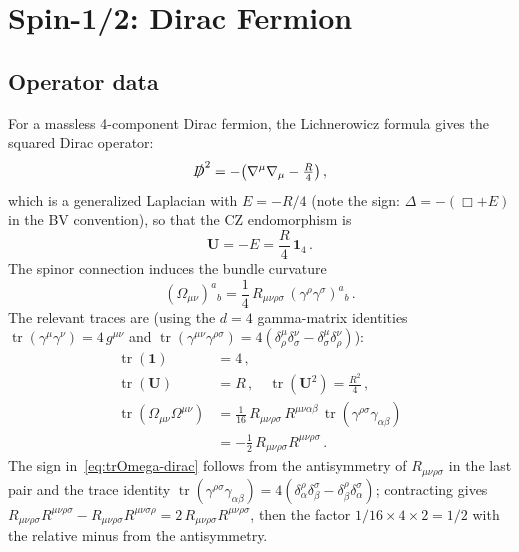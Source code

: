 \documentclass[aps,prd,twocolumn,superscriptaddress,nofootinbib,floatfix]{revtex4-2}
\theoremstyle{definition}
\theoremstyle{remark}
\newcommand{\Riemsq}{R_{\mu\nu\rho\sigma}R^{\mu\nu\rho\sigma}}
\newcommand{\tr}{\operatorname{tr}}
\begin{document}
\section{Spin-1/2: Dirac Fermion}
\label{sec:dirac}

\subsection{Operator data}

For a massless 4-component Dirac fermion, the Lichnerowicz formula gives the
squared Dirac operator:
\begin{equation}
  \slashed{D}^2 = -\bigl(\nabla^\mu\nabla_\mu - \tfrac{R}{4}\bigr)\,,
  \label{eq:lichnerowicz}
\end{equation}
which is a generalized Laplacian with $E = -R/4$ (note the sign:
$\Delta = -(\Box + E)$ in the BV convention), so that the CZ endomorphism is
\begin{equation}
  \mathbf{U} = -E = \frac{R}{4}\,\mathbf{1}_4\,.
  \label{eq:U-dirac}
\end{equation}
The spinor connection induces the bundle curvature
\begin{equation}
  (\Omega_{\mu\nu})^a{}_b = \frac{1}{4}\,R_{\mu\nu\rho\sigma}\,
    (\gamma^{\rho}\gamma^{\sigma})^a{}_b\,.
  \label{eq:Omega-dirac}
\end{equation}
The relevant traces are (using the $d = 4$ gamma-matrix identities
$\tr(\gamma^\mu\gamma^\nu) = 4\,g^{\mu\nu}$ and
$\tr(\gamma^{\mu\nu}\gamma^{\rho\sigma}) =
4(\delta^\mu_\rho\delta^\nu_\sigma - \delta^\mu_\sigma\delta^\nu_\rho)$):
\begin{subequations}
\label{eq:dirac-traces}
\begin{align}
  \tr(\mathbf{1}) &= 4\,,\\
  \tr(\mathbf{U}) &= R\,,\quad
  \tr(\mathbf{U}^2) = \frac{R^2}{4}\,,\\
  \tr(\Omega_{\mu\nu}\Omega^{\mu\nu})
    &= \frac{1}{16}\,R_{\mu\nu\rho\sigma}\,R^{\mu\nu\alpha\beta}\,
    \tr(\gamma^{\rho\sigma}\gamma_{\alpha\beta}) \nonumber\\
    &= -\frac{1}{2}\,\Riemsq\,.
  \label{eq:trOmega-dirac}
\end{align}
\end{subequations}
The sign in~\eqref{eq:trOmega-dirac} follows from the antisymmetry of
$R_{\mu\nu\rho\sigma}$ in the last pair and the trace identity
$\tr(\gamma^{\rho\sigma}\gamma_{\alpha\beta}) =
4(\delta^\rho_\alpha\delta^\sigma_\beta -
\delta^\rho_\beta\delta^\sigma_\alpha)$; contracting gives
$R_{\mu\nu\rho\sigma}R^{\mu\nu\rho\sigma} - R_{\mu\nu\rho\sigma}R^{\mu\nu\sigma\rho} = 2\,\Riemsq$,
then the factor $1/16 \times 4 \times 2 = 1/2$ with the relative minus from
the antisymmetry.
\end{document}
